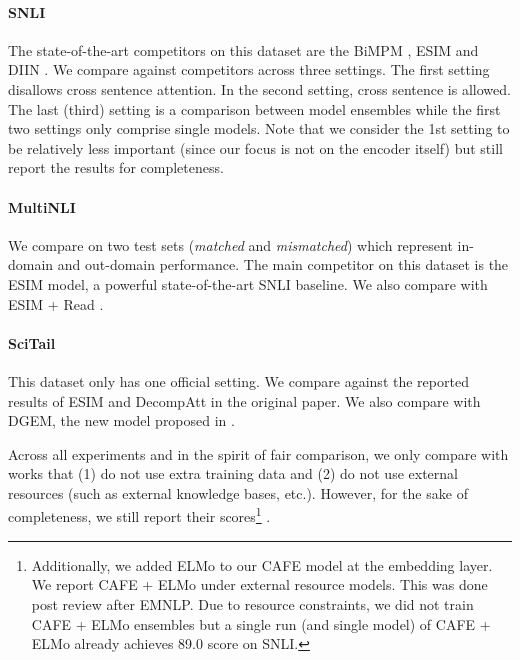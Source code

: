 \documentclass[11pt,a4paper]{article}
\begin{document}
\paragraph{SNLI} The state-of-the-art competitors on this dataset are the BiMPM \cite{DBLP:conf/ijcai/WangHF17}, ESIM \cite{DBLP:conf/acl/ChenZLWJI17} and DIIN \cite{DBLP:journals/corr/abs-1709-04348}. We compare against competitors across three settings. The first setting disallows cross sentence attention. In the second setting, cross sentence is allowed. The last (third) setting is a comparison between model ensembles while the first two settings only comprise single models. Note that we consider the 1st setting to be relatively less important (since our focus is not on the encoder itself) but still report the results for completeness.


\paragraph{MultiNLI} We compare on two test sets (\textit{matched} and \textit{mismatched}) which represent in-domain and out-domain performance. The main competitor on this dataset is the ESIM model, a powerful state-of-the-art SNLI baseline. We also compare with ESIM + Read \cite{DBLP:journals/corr/Weissenborn17}.
\paragraph{SciTail} This dataset only has one official setting. We compare against the reported results of ESIM \cite{DBLP:conf/acl/ChenZLWJI17} and DecompAtt \cite{DBLP:conf/emnlp/ParikhT0U16} in the original paper. We also compare with DGEM, the new model proposed in \cite{scitail}.

Across all experiments and in the spirit of fair comparison, we only compare with works that (1) do not use extra training data and (2) do not use external resources (such as external knowledge bases, etc.). However, for the sake of completeness, we still report their scores\footnote{Additionally, we added ELMo \cite{peters2018deep} to our CAFE model at the embedding layer. We report CAFE + ELMo under external resource models. This was done post review after EMNLP. Due to resource constraints, we did not train CAFE + ELMo ensembles but a single run (and single model) of CAFE + ELMo already achieves 89.0 score on SNLI. } \cite{mccann2017learned,chen2017natural,peters2018deep}.
\end{document}
